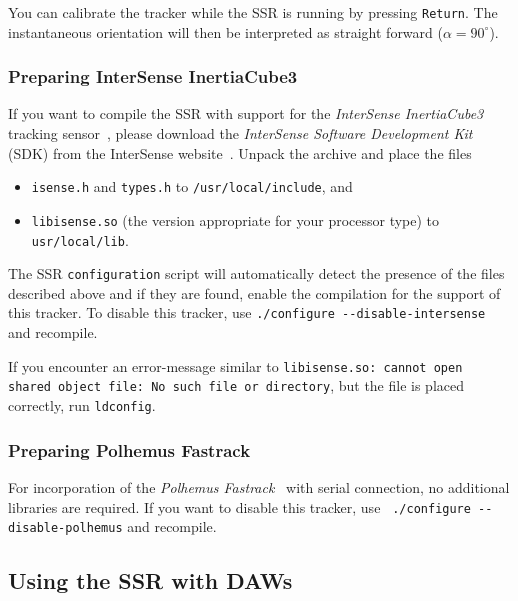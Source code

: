 You can calibrate the tracker while the SSR is running by pressing
\texttt{Return}.
The instantaneous
orientation will then be interpreted as straight forward ($\alpha = 90^\circ$).

\subsubsection{Preparing InterSense InertiaCube3}
\label{sec:prep_isense}

If you want to compile the SSR with support for the \emph{InterSense
InertiaCube3}
tracking sensor~\cite{intersense}, please download the \emph{InterSense Software
Development Kit} (SDK) from the InterSense website~\cite{intersense}.
Unpack the archive and place the files

\begin{itemize}
\item \verb+isense.h+ and \verb+types.h+ to \verb+/usr/local/include+, and
\item \verb+libisense.so+
  (the version appropriate for your processor type)
  to \verb+usr/local/lib+.
\end{itemize}
%
The SSR \texttt{configuration} script will automatically detect the presence of
the files described above and if they are found, enable the compilation for the 
support of this tracker. To disable this tracker, use 
\verb+./configure --disable-intersense+ and recompile.

If you encounter an error-message similar to \texttt{libisense.so: cannot open 
shared object file: No such file or directory}, but the file is placed 
correctly, run \verb|ldconfig|. 

\subsubsection{Preparing Polhemus Fastrack}
\label{sec:prep_pol}
For incorporation of the \emph{Polhemus Fastrack}~\cite{fastrack} with serial
connection, no additional libraries are required.
If you want to disable this
tracker, use \verb+ ./configure --disable-polhemus+ and recompile.

\subsection{Using the SSR with DAWs}

